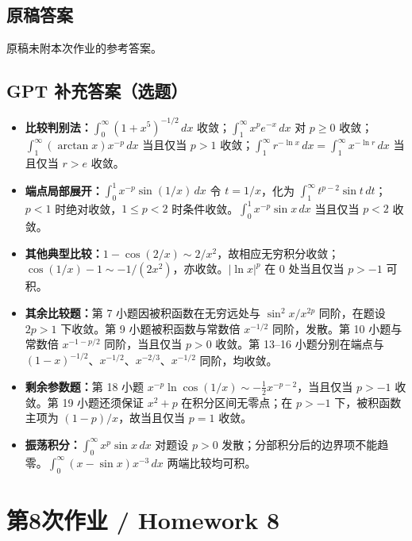 \documentclass[UTF8,11pt, a4paper, oneside, fontset=none]{ctexbook}
\begin{document}
\subsection*{原稿答案}
\noindent 原稿未附本次作业的参考答案。
\clearpage
\subsection*{GPT 补充答案（选题）}
\begin{itemize}
\item \textbf{比较判别法：}$\int_0^\infty(1+x^5)^{-1/2}\,dx$ 收敛；$\int_1^\infty x^pe^{-x}\,dx$ 对 $p\ge0$ 收敛；$\int_1^\infty(\arctan x)x^{-p}\,dx$ 当且仅当 $p>1$ 收敛；$\int_1^\infty r^{-\ln x}\,dx=\int_1^\infty x^{-\ln r}\,dx$ 当且仅当 $r>e$ 收敛。
\item \textbf{端点局部展开：}$\int_0^1x^{-p}\sin(1/x)\,dx$ 令 $t=1/x$，化为 $\int_1^\infty t^{p-2}\sin t\,dt$；$p<1$ 时绝对收敛，$1\le p<2$ 时条件收敛。$\int_0^1x^{-p}\sin x\,dx$ 当且仅当 $p<2$ 收敛。
\item \textbf{其他典型比较：}$1-\cos(2/x)\sim2/x^2$，故相应无穷积分收敛；$\cos(1/x)-1\sim-1/(2x^2)$，亦收敛。$|\ln x|^p$ 在 $0$ 处当且仅当 $p>-1$ 可积。
\item \textbf{其余比较题：}第 7 小题因被积函数在无穷远处与 $\sin^2x/x^{2p}$ 同阶，在题设 $2p>1$ 下收敛。第 9 小题被积函数与常数倍 $x^{-1/2}$ 同阶，发散。第 10 小题与常数倍 $x^{-1-p/2}$ 同阶，当且仅当 $p>0$ 收敛。第 13--16 小题分别在端点与 $(1-x)^{-1/2}$、$x^{-1/2}$、$x^{-2/3}$、$x^{-1/2}$ 同阶，均收敛。
\item \textbf{剩余参数题：}第 18 小题 $x^{-p}\ln\cos(1/x)\sim-\tfrac12x^{-p-2}$，当且仅当 $p>-1$ 收敛。第 19 小题还须保证 $x^2+p$ 在积分区间无零点；在 $p>-1$ 下，被积函数主项为 $(1-p)/x$，故当且仅当 $p=1$ 收敛。
\item \textbf{振荡积分：}$\int_0^\infty x^p\sin x\,dx$ 对题设 $p>0$ 发散；分部积分后的边界项不能趋零。$\int_0^\infty(x-\sin x)x^{-3}\,dx$ 两端比较均可积。
\end{itemize}
\clearpage
\section{第8次作业 / Homework 8}
\end{document}
